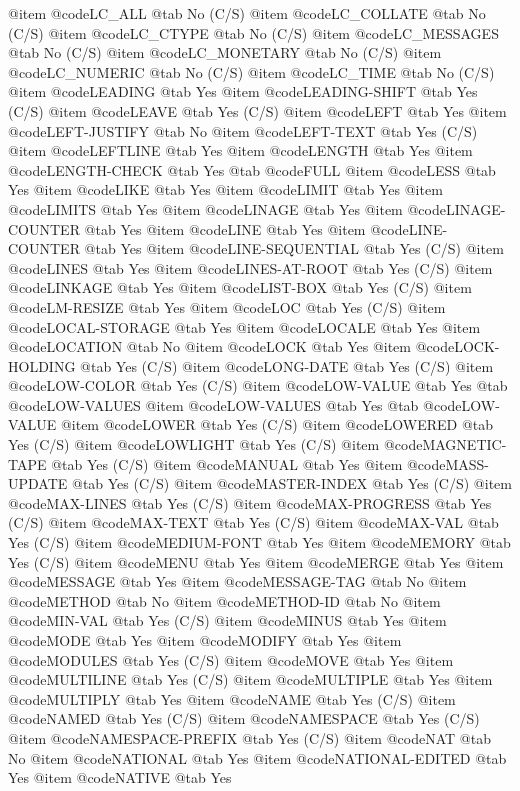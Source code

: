 @item @code{LC_ALL} @tab No (C/S)
@item @code{LC_COLLATE} @tab No (C/S)
@item @code{LC_CTYPE} @tab No (C/S)
@item @code{LC_MESSAGES} @tab No (C/S)
@item @code{LC_MONETARY} @tab No (C/S)
@item @code{LC_NUMERIC} @tab No (C/S)
@item @code{LC_TIME} @tab No (C/S)
@item @code{LEADING} @tab Yes
@item @code{LEADING-SHIFT} @tab Yes (C/S)
@item @code{LEAVE} @tab Yes (C/S)
@item @code{LEFT} @tab Yes
@item @code{LEFT-JUSTIFY} @tab No
@item @code{LEFT-TEXT} @tab Yes (C/S)
@item @code{LEFTLINE} @tab Yes
@item @code{LENGTH} @tab Yes
@item @code{LENGTH-CHECK} @tab Yes @tab @code{FULL}
@item @code{LESS} @tab Yes
@item @code{LIKE} @tab Yes
@item @code{LIMIT} @tab Yes
@item @code{LIMITS} @tab Yes
@item @code{LINAGE} @tab Yes
@item @code{LINAGE-COUNTER} @tab Yes
@item @code{LINE} @tab Yes
@item @code{LINE-COUNTER} @tab Yes
@item @code{LINE-SEQUENTIAL} @tab Yes (C/S)
@item @code{LINES} @tab Yes
@item @code{LINES-AT-ROOT} @tab Yes (C/S)
@item @code{LINKAGE} @tab Yes
@item @code{LIST-BOX} @tab Yes (C/S)
@item @code{LM-RESIZE} @tab Yes
@item @code{LOC} @tab Yes (C/S)
@item @code{LOCAL-STORAGE} @tab Yes
@item @code{LOCALE} @tab Yes
@item @code{LOCATION} @tab No
@item @code{LOCK} @tab Yes
@item @code{LOCK-HOLDING} @tab Yes (C/S)
@item @code{LONG-DATE} @tab Yes (C/S)
@item @code{LOW-COLOR} @tab Yes (C/S)
@item @code{LOW-VALUE} @tab Yes @tab @code{LOW-VALUES}
@item @code{LOW-VALUES} @tab Yes @tab @code{LOW-VALUE}
@item @code{LOWER} @tab Yes (C/S)
@item @code{LOWERED} @tab Yes (C/S)
@item @code{LOWLIGHT} @tab Yes (C/S)
@item @code{MAGNETIC-TAPE} @tab Yes (C/S)
@item @code{MANUAL} @tab Yes
@item @code{MASS-UPDATE} @tab Yes (C/S)
@item @code{MASTER-INDEX} @tab Yes (C/S)
@item @code{MAX-LINES} @tab Yes (C/S)
@item @code{MAX-PROGRESS} @tab Yes (C/S)
@item @code{MAX-TEXT} @tab Yes (C/S)
@item @code{MAX-VAL} @tab Yes (C/S)
@item @code{MEDIUM-FONT} @tab Yes
@item @code{MEMORY} @tab Yes (C/S)
@item @code{MENU} @tab Yes
@item @code{MERGE} @tab Yes
@item @code{MESSAGE} @tab Yes
@item @code{MESSAGE-TAG} @tab No
@item @code{METHOD} @tab No
@item @code{METHOD-ID} @tab No
@item @code{MIN-VAL} @tab Yes (C/S)
@item @code{MINUS} @tab Yes
@item @code{MODE} @tab Yes
@item @code{MODIFY} @tab Yes
@item @code{MODULES} @tab Yes (C/S)
@item @code{MOVE} @tab Yes
@item @code{MULTILINE} @tab Yes (C/S)
@item @code{MULTIPLE} @tab Yes
@item @code{MULTIPLY} @tab Yes
@item @code{NAME} @tab Yes (C/S)
@item @code{NAMED} @tab Yes (C/S)
@item @code{NAMESPACE} @tab Yes (C/S)
@item @code{NAMESPACE-PREFIX} @tab Yes (C/S)
@item @code{NAT} @tab No
@item @code{NATIONAL} @tab Yes
@item @code{NATIONAL-EDITED} @tab Yes
@item @code{NATIVE} @tab Yes
